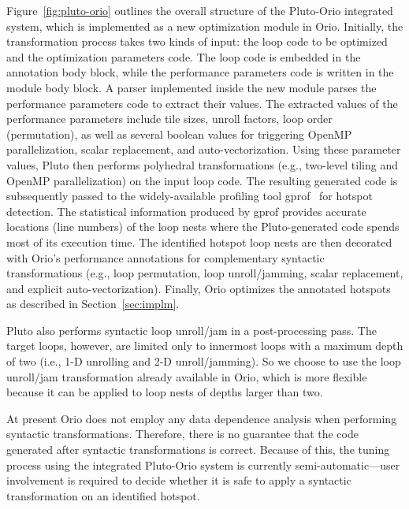 Figure~\ref{fig:pluto-orio} outlines the overall structure of the
Pluto-Orio integrated system, which is implemented as a new
optimization module in Orio. Initially, the transformation process
takes two kinds of input: the loop code to be optimized and the
optimization parameters code. The loop code is embedded in the
annotation body block, while the performance parameters code is
written in the module body block. A parser implemented inside
the new module parses the performance parameters code to extract their
values. The extracted values of the performance parameters include
tile sizes, unroll factors, loop order (permutation), as well as
several boolean values for triggering OpenMP parallelization, scalar
replacement, and auto-vectorization. Using these parameter values,
Pluto then performs polyhedral transformations (e.g., two-level tiling
and OpenMP parallelization) on the input loop code. The resulting
generated code is subsequently passed to the widely-available
profiling tool gprof~\cite{gprof} for hotspot detection. The
statistical information produced by gprof provides accurate locations
(line numbers) of the loop nests where the Pluto-generated code spends
most of its execution time. The identified hotspot loop nests are then
decorated with Orio's performance annotations for complementary
syntactic transformations (e.g., loop permutation, loop
unroll/jamming, scalar replacement, and explicit
auto-vectorization). Finally, Orio optimizes the annotated hotspots as
described in Section~\ref{sec:implm}.

Pluto also performs syntactic loop unroll/jam in a post-processing
pass. The target loops, however, are limited only to innermost loops with a
maximum depth of two (i.e., 1-D unrolling and 2-D unroll/jamming). So we
choose to use the loop unroll/jam transformation already available in
Orio, which is more flexible because it can be applied to loop nests of
depths larger than two.



At present Orio does not employ any data dependence analysis when performing
syntactic transformations. Therefore, there is no guarantee that the code
generated after syntactic transformations is correct. Because of this, the
tuning process using the integrated Pluto-Orio system is currently
semi-automatic---user involvement is required to decide whether it is safe
to apply a syntactic transformation on an identified hotspot.



